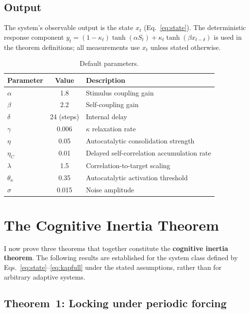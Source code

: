 \subsection{Output}

The system's observable output is the state $x_t$ (Eq.~\eqref{eq:state}). The deterministic response component $y_t = (1-\kappa_t)\tanh(\alpha S_t) + \kappa_t\tanh(\beta x_{t-\delta})$ is used in the theorem definitions; all measurements use $x_t$ unless stated otherwise.

\begin{table}[h]
\centering
\caption{Default parameters.}
\label{tab:params}
\begin{tabular}{lcl}
\toprule
Parameter & Value & Description \\
\midrule
$\alpha$ & 1.8 & Stimulus coupling gain \\
$\beta$ & 2.2 & Self-coupling gain \\
$\delta$ & 24 (steps) & Internal delay \\
$\gamma$ & 0.006 & $\kappa$ relaxation rate \\
$\eta$ & 0.05 & Autocatalytic consolidation strength \\
$\eta_C$ & 0.01 & Delayed self-correlation accumulation rate \\
$\lambda$ & 1.5 & Correlation-to-target scaling \\
$\theta_\kappa$ & 0.35 & Autocatalytic activation threshold \\
$\sigma$ & 0.015 & Noise amplitude \\
\bottomrule
\end{tabular}
\end{table}

\section{The Cognitive Inertia Theorem}

I now prove three theorems that together constitute the \textbf{cognitive inertia theorem}. The following results are established for the system class defined by Eqs.~\eqref{eq:state}--\eqref{eq:kapfull} under the stated assumptions, rather than for arbitrary adaptive systems.

\subsection{Theorem~1: Locking under periodic forcing}

